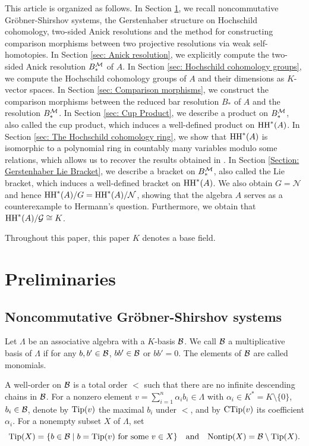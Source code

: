 \documentclass[10pt, reqno]{amsart}
\theoremstyle{definition}
\theoremstyle{remark}
\numberwithin{equation}{section}
\begin{document}
This article is organized as follows. In Section \ref{sec: Preliminaries}, we recall noncommutative Gr\"obner-Shirshov systems, the Gerstenhaber structure on Hochschild cohomology, two-sided Anick resolutions and the method for constructing comparison morphisms between two projective resolutions via weak self-homotopies. In Section \ref{sec: Anick resolution}, we explicitly compute the two-sided Anick resolution $B_*^{\mathcal{M}}$ of $A$. In Section \ref{sec: Hochschild cohomology groups}, we compute the Hochschild cohomology groups of $A$ and their dimensions as $K$-vector spaces. In Section \ref{sec: Comparison morphisms}, we construct the comparison morphisms between the reduced bar resolution $B_*$ of $A$ and the resolution $B_*^{\mathcal{M}}$. In Section \ref{sec: Cup Product}, we describe a product on $B_*^{\mathcal{M}}$, also called the cup product, which induces a well-defined product on $\mathrm{HH}^*(A)$. In Section \ref{sec: The Hochschild cohomology ring}, we show that $\mathrm{HH}^*
(A)$ is isomorphic to a polynomial ring in countably many variables modulo some relations, which allows us to recover the results obtained in \cite{Xu08, Sna09}. In Section \ref{Section: Gerstenhaber Lie Bracket}, we describe a bracket on $B_*^{\mathcal{M}}$, also called
the Lie bracket, which induces a well-defined bracket on $\mathrm{HH}^*(A)$. We also obtain $G=\mathcal{N}$ and hence $\mathrm{HH}^*(A)/G=\mathrm{HH}^*(A)/\mathcal{N}$, showing that the algebra $A$ serves as a counterexample to Hermann's question. Furthermore, we obtain that $\mathrm{HH}^*(A)/\mathcal{G}\cong K$.

Throughout this paper, this paper $K$ denotes a base field. 

\section{Preliminaries}\label{sec: Preliminaries}
\subsection{Noncommutative Gr\"obner-Shirshov systems}\mbox{}

Let \(\Lambda\) be an associative algebra  with a \(K\)-basis \(\mathcal{B}\). 
We call \(\mathcal{B}\) a multiplicative basis of \(\Lambda\) if  for any $b,  b'\in \mathcal{B}$, $bb'\in \mathcal{B}$ or $bb'=0$. The elements of \(\mathcal{B}\) are called monomials.


A well-order  on \(\mathcal{B}\) is a total order \(<\) such that there are no infinite descending chains in \(\mathcal{B}\).
For a nonzero element \(v = \sum_{i=1}^{n} \alpha_i b_i \in \Lambda\) with $\alpha_i \in K^*=K\setminus \{0\}$, $b_i \in \mathcal{B}$, denote by 
\(\mathrm{Tip}(v)\) the maximal \(b_i\) under \(<\), and by \(\mathrm{CTip}(v)\) its coefficient \(\alpha_i\).
For a nonempty subset \(X\) of \(\Lambda\), set
\[\mathrm{Tip}(X)=\{b \in \mathcal{B} \mid b=\mathrm{Tip}(v)\text{ for some }v\in X\} \quad\text{and}\quad \mathrm{Nontip}(X)=\mathcal{B}\setminus \mathrm{Tip}(X).\]
\end{document}
